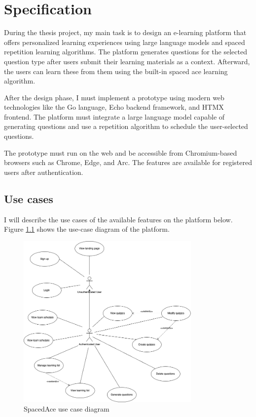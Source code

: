 \chapter{Specification}\label{ch:specification}

During the thesis project, my main task is to design an e-learning platform that offers personalized learning experiences using large language models and spaced repetition learning algorithms. The platform generates questions for the selected question type after users submit their learning materials as a context. Afterward, the users can learn these from them using the built-in spaced ace learning algorithm.

After the design phase, I must implement a prototype using modern web technologies like the Go language, Echo backend framework, and HTMX frontend. The platform must integrate a large language model capable of generating questions and use a repetition algorithm to schedule the user-selected questions.

The prototype must run on the web and be accessible from Chromium-based browsers such as Chrome, Edge, and Arc. The features are available for registered users after authentication.

\section{Use cases}

I will describe the use cases of the available features on the platform below. Figure \ref{fig:use-case} shows the use-case diagram of the platform.

\begin{figure}[H]
    \centering
    \includegraphics[width=0.8\textwidth, keepaspectratio]{figures/use-case.png}
    \caption{SpacedAce use case diagram}
    \label{fig:use-case}
\end{figure}

